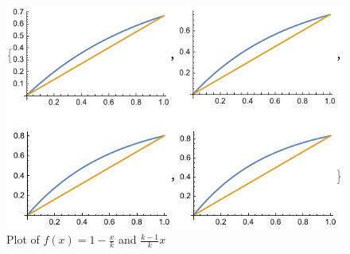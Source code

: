 \documentclass[a4paper, 12pt, titlepage]{article}
\begin{document}
\begin{figure} 
    \includegraphics{figure2.pdf}
    \caption{Plot of $f(x) = 1 - \frac{x}{k}$ and $\frac{k - 1}{k} x$}
    \centering
\end{figure}
\end{document}
